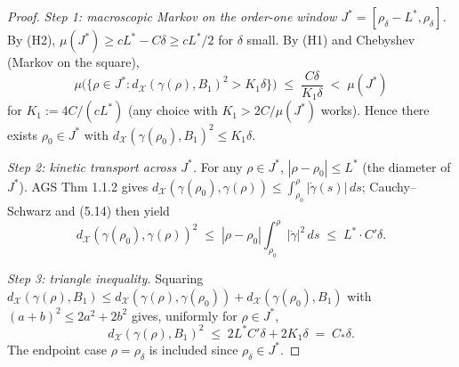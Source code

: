 \documentclass[11pt]{article}
\theoremstyle{definition}
\newcommand{\X}{\mathcal X}
\begin{document}
\begin{proof}
\emph{Step 1: macroscopic Markov on the order-one window
$J^*=[\rho_\delta-L^*,\rho_\delta]$.}
By (H2), $\mu(J^*)\ge cL^*-C\delta\ge cL^*/2$ for $\delta$ small. By
(H1) and Chebyshev (Markov on the square),
\[
   \mu\bigl(\{\rho\in J^*:d_\X(\gamma(\rho),B_1)^2>K_1\delta\}\bigr)
   \;\le\;\frac{C\delta}{K_1\delta}\;<\;\mu(J^*)
\]
for $K_1:=4C/(cL^*)$ (any choice with $K_1>2C/\mu(J^*)$ works). Hence
there exists $\rho_0\in J^*$ with
$d_\X(\gamma(\rho_0),B_1)^2\le K_1\delta$.

\emph{Step 2: kinetic transport across $J^*$.} For any $\rho\in J^*$,
$|\rho-\rho_0|\le L^*$ (the diameter of $J^*$). AGS Thm 1.1.2
\cite[Thm.~1.1.2]{AGS2008} gives
$d_\X(\gamma(\rho_0),\gamma(\rho))\le\int_{\rho_0}^{\rho}|\dot\gamma(s)|\,ds$;
Cauchy--Schwarz and (5.14) then yield
\[
   d_\X(\gamma(\rho_0),\gamma(\rho))^2
   \;\le\;|\rho-\rho_0|\!\!\int_{\rho_0}^{\rho}|\dot\gamma|^2\,ds
   \;\le\;L^*\!\cdot C'\delta.
\]

\emph{Step 3: triangle inequality.} Squaring
$d_\X(\gamma(\rho),B_1)\le d_\X(\gamma(\rho),\gamma(\rho_0))+d_\X(\gamma(\rho_0),B_1)$
with $(a+b)^2\le 2a^2+2b^2$ gives, uniformly for $\rho\in J^*$,
\[
   d_\X(\gamma(\rho),B_1)^2\;\le\;2L^*C'\delta+2K_1\delta\;=\;C_*\delta.
\]
The endpoint case $\rho=\rho_\delta$ is included since $\rho_\delta\in J^*$.
\end{proof}
\end{document}
